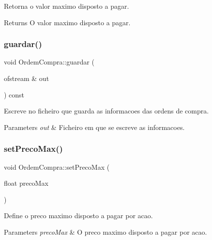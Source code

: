 Retorna o valor maximo disposto a pagar. 

\begin{DoxyReturn}{Returns}
O valor maximo disposto a pagar. 
\end{DoxyReturn}
\hypertarget{class_ordem_compra_ae4c663bb3b6d507fabc7d02fa244cd56}{}\label{class_ordem_compra_ae4c663bb3b6d507fabc7d02fa244cd56} 
\subsubsection{\texorpdfstring{guardar()}{guardar()}}
{\footnotesize\ttfamily void Ordem\+Compra\+::guardar (\begin{DoxyParamCaption}\item[{ofstream \&}]{out }\end{DoxyParamCaption}) const}



Escreve no ficheiro que guarda as informacoes das ordens de compra. 


\begin{DoxyParams}{Parameters}
{\em out} & Ficheiro em que se escreve as informacoes. \\
\hline
\end{DoxyParams}
\hypertarget{class_ordem_compra_aab6b393722db7f13fa0c37eddb1b4b04}{}\label{class_ordem_compra_aab6b393722db7f13fa0c37eddb1b4b04} 
\subsubsection{\texorpdfstring{set\+Preco\+Max()}{setPrecoMax()}}
{\footnotesize\ttfamily void Ordem\+Compra\+::set\+Preco\+Max (\begin{DoxyParamCaption}\item[{float}]{preco\+Max }\end{DoxyParamCaption})\hspace{0.3cm}{\ttfamily [inline]}}



Define o preco maximo disposto a pagar por acao. 


\begin{DoxyParams}{Parameters}
{\em preco\+Max} & O preco maximo disposto a pagar por acao. \\
\hline
\end{DoxyParams}
\hypertarget{class_ordem_compra_ada9283bb3eda59fd0f6b10aa7e2b86c2}{}\label{class_ordem_compra_ada9283bb3eda59fd0f6b10aa7e2b86c2} 
